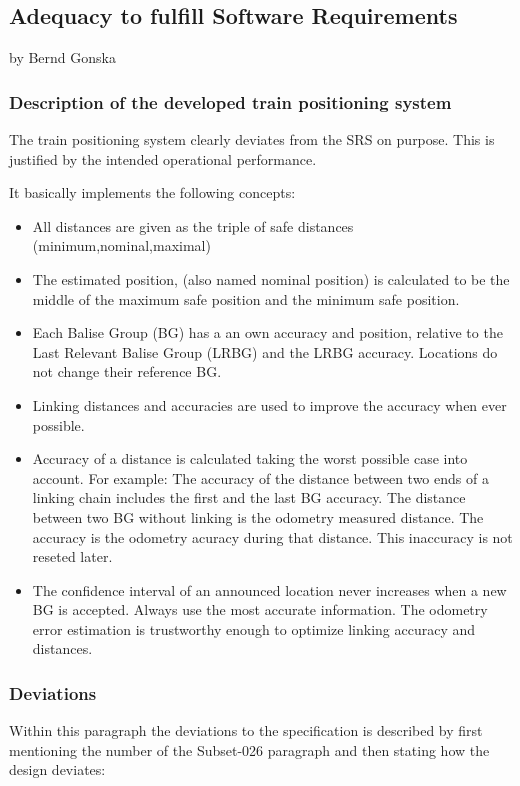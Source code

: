 \subsection{Adequacy to fulfill Software Requirements}
by Bernd Gonska

\subsubsection{Description of the developed train positioning system}
The train positioning system clearly deviates from the SRS on purpose. This is justified by the intended operational performance.

It basically implements the following concepts:
\begin{itemize}
\item All distances are given as the triple of safe distances (minimum,nominal,maximal)

\item The estimated position, (also named nominal position) is calculated to be the middle of the maximum safe position and the minimum safe position.

\item Each Balise Group (BG) has a an own accuracy and position, relative to the Last Relevant Balise Group (LRBG) and the LRBG accuracy. Locations do not change their reference BG.
  
\item Linking distances and accuracies are used to improve the accuracy when ever possible.

\item Accuracy of a distance is calculated taking the worst possible case into account. For example: The accuracy of the distance between two ends of a linking chain includes the first and the last BG accuracy. The distance between two BG without linking is the odometry measured distance. The accuracy is the odometry acuracy during that distance. This inaccuracy is not reseted later.

\item The confidence interval of an announced location never increases when a new BG is accepted. Always use the most accurate information. The odometry error estimation is trustworthy enough to optimize linking accuracy and distances.
\end{itemize}

\subsubsection{Deviations}
Within this paragraph the deviations to the specification is described by first mentioning the number of the Subset-026 paragraph \cite{SRS}
and then stating how the design deviates:

